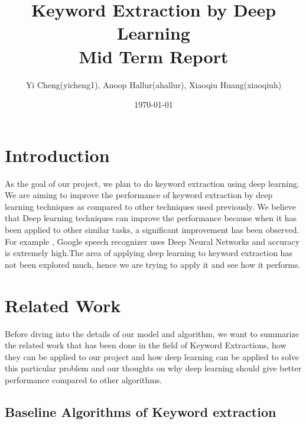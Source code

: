 \documentclass[dvips,12pt]{article}
\begin{document}
	
	
	\title{Keyword Extraction by Deep Learning \\Mid Term Report}
	\author{Yi Cheng(yicheng1), Anoop Hallur(ahallur), Xiaoqiu Huang(xiaoqiuh)}
	\date{\today}
	
	
	\maketitle
	
	
	\section{Introduction}
	
		As the goal of our project, we plan to do keyword extraction using deep learning. We are aiming to improve the performance of keyword extraction by deep learning techniques as compared to other techniques used previously.
		We believe that Deep learning techniques can improve the performance because when it has been applied to other similar tasks, a significant improvement has been observed.
		For example , Google speech recognizer uses Deep Neural Networks and accuracy is extremely high\cite{hinton2012deep}.The area of applying deep learning to keyword extraction has not been explored much, hence we are trying to apply it and see how it performs.
	\section{Related Work}
	
		Before diving into the details of our model and algorithm, we want to summarize the related work that has been done in the field of Keyword Extractions, how they can be applied to our project and how deep learning can be applied to solve this particular problem and our thoughts on why deep learning should give better performance compared to other algorithms.
		
		\subsection{Baseline Algorithms of Keyword extraction}
		
\end{document}
